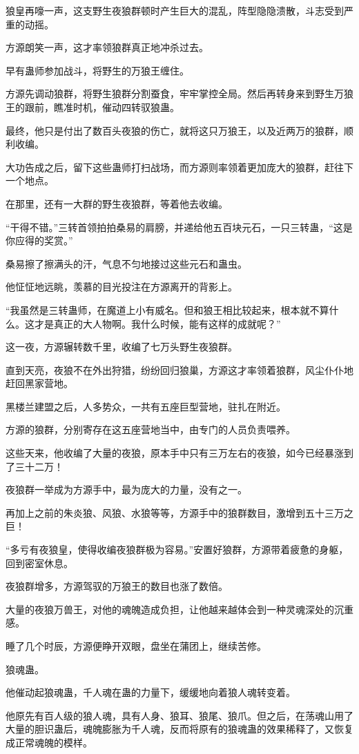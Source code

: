 \begin{this_body}
狼皇再嚎一声，这支野生夜狼群顿时产生巨大的混乱，阵型隐隐溃散，斗志受到严重的动摇。

方源朗笑一声，这才率领狼群真正地冲杀过去。

早有蛊师参加战斗，将野生的万狼王缠住。

方源先调动狼群，将野生狼群分割蚕食，牢牢掌控全局。然后再转身来到野生万狼王的跟前，瞧准时机，催动四转驭狼蛊。

最终，他只是付出了数百头夜狼的伤亡，就将这只万狼王，以及近两万的狼群，顺利收编。

大功告成之后，留下这些蛊师打扫战场，而方源则率领着更加庞大的狼群，赶往下一个地点。

在那里，还有一大群的野生夜狼群，等着他去收编。

“干得不错。”三转首领拍拍桑易的肩膀，并递给他五百块元石，一只三转蛊，“这是你应得的奖赏。”

桑易擦了擦满头的汗，气息不匀地接过这些元石和蛊虫。

他怔怔地远眺，羡慕的目光投注在方源离开的背影上。

“我虽然是三转蛊师，在魔道上小有威名。但和狼王相比较起来，根本就不算什么。这才是真正的大人物啊。我什么时候，能有这样的成就呢？”

这一夜，方源辗转数千里，收编了七万头野生夜狼群。

直到天亮，夜狼不在外出狩猎，纷纷回归狼巢，方源这才率领着狼群，风尘仆仆地赶回黑家营地。

黑楼兰建盟之后，人多势众，一共有五座巨型营地，驻扎在附近。

方源的狼群，分别寄存在这五座营地当中，由专门的人员负责喂养。

这些天来，他收编了大量的夜狼，原本手中只有三万左右的夜狼，如今已经暴涨到了三十二万！

夜狼群一举成为方源手中，最为庞大的力量，没有之一。

再加上之前的朱炎狼、风狼、水狼等等，方源手中的狼群数目，激增到五十三万之巨！

“多亏有夜狼皇，使得收编夜狼群极为容易。”安置好狼群，方源带着疲惫的身躯，回到密室休息。

夜狼群增多，方源驾驭的万狼王的数目也涨了数倍。

大量的夜狼万兽王，对他的魂魄造成负担，让他越来越体会到一种灵魂深处的沉重感。

睡了几个时辰，方源便睁开双眼，盘坐在蒲团上，继续苦修。

狼魂蛊。

他催动起狼魂蛊，千人魂在蛊的力量下，缓缓地向着狼人魂转变着。

他原先有百人级的狼人魂，具有人身、狼耳、狼尾、狼爪。但之后，在荡魂山用了大量的胆识蛊后，魂魄膨胀为千人魂，反而将原有的狼魂蛊的效果稀释了，又恢复成正常魂魄的模样。


\end{this_body}
